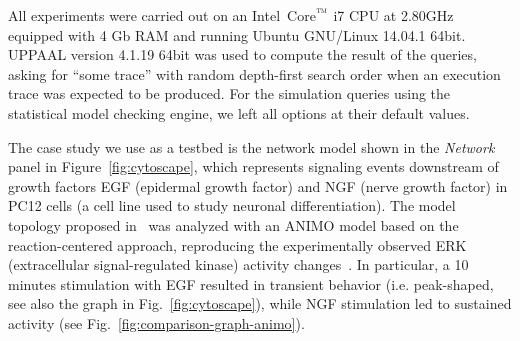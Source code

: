 \documentclass{llncs}
\begin{document}
All experiments were carried out on an Intel\circledR\ Core$^{\mbox{\scriptsize\texttrademark}}$ i7 CPU at 2.80GHz equipped with 4 Gb RAM
and running Ubuntu GNU/Linux 14.04.1 64bit.
UPPAAL version 4.1.19 64bit was used to compute the result of the queries, asking for ``some trace'' with random depth-first search order
when an execution trace was expected to be produced. For the simulation queries using the statistical model checking engine, we left
all options at their default values.

The case study we use as a testbed is the network model shown in the \emph{Network} panel in Figure~\ref{fig:cytoscape},
which represents signaling events downstream of growth factors EGF (epidermal growth factor)
and NGF (nerve growth factor) in PC12 cells (a cell line used to study neuronal differentiation).
The model topology proposed in~\cite{egf-ngf} was analyzed
with an ANIMO model based on the reaction-centered approach, reproducing the experimentally 
observed ERK (extracellular signal-regulated kinase) activity changes~\cite{animo-ieee}.
In particular, a 10 minutes stimulation with EGF resulted in transient behavior (i.e. peak-shaped,
see also the graph in Fig.~\ref{fig:cytoscape}), while NGF stimulation led to sustained activity (see Fig.~\ref{fig:comparison-graph-animo}).
\end{document}
